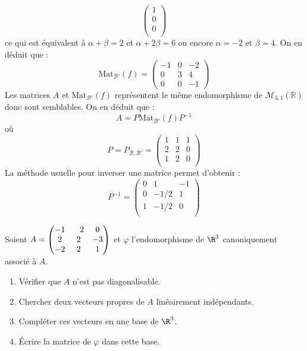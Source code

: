 \documentclass[a4paper,10pt]{report}
\begin{document}
\begin{enumerate}
$$\begin{pmatrix}
1 \\
0 \\
0 \\
\end{pmatrix}$$
ce qui est équivalent à $\alpha+ \beta =2$ et $\alpha+2 \beta =6$ ou encore $\alpha=-2$ et $\beta =4$. On en déduit que :
$$ \textrm{Mat}_{\mathcal{B}'}(f) = \begin{pmatrix}
-1 & 0 & -2 \\
0 & 3 & 4 \\
0 & 0 & -1
\end{pmatrix}$$
Les matrices $A$ et $\textrm{Mat}_{\mathcal{B}'}(f)$ représentent le même endomorphisme de $\mathcal{M}_{3,1}(\mathbb{R})$ donc sont semblables. On en déduit que :
$$ A = P \textrm{Mat}_{\mathcal{B}'}(f) P^{-1}$$
où 
$$P=P_{\mathcal{B}, \mathcal{B}'} = \begin{pmatrix}
1 & 1 & 1 \\
2 & 2 & 0 \\
1 & 2 & 0 \\
\end{pmatrix}$$
La méthode usuelle pour inverser une matrice permet d'obtenir :
$$ P^{-1} = \begin{pmatrix}
0 & 1 & -1 \\
0 & -1/2 & 1 \\
1 & -1/2 & 0 \\
\end{pmatrix}$$

\end{enumerate}

\begin{Exa} Soient $A = \begin{pmatrix} -1 &\phantom-2 & 0 \cr 2 &2 &-3 \cr -2 &2 &1 \cr \end{pmatrix}$ et $\varphi$ l'endomorphisme de $\R^3$ canoniquement associé à $A$.

\begin{enumerate}
  \item Vérifier que $A$ n'est pas diagonalisable.
    
  \item Chercher deux vecteurs propres de $A$ linéairement indépendants.
    
  \item Compléter ces vecteurs en une base de $\R^3$.
    
  \item \'Ecrire la matrice de $\varphi$ dans cette base.
        
\end{enumerate}
\end{Exa} 
\end{document}
